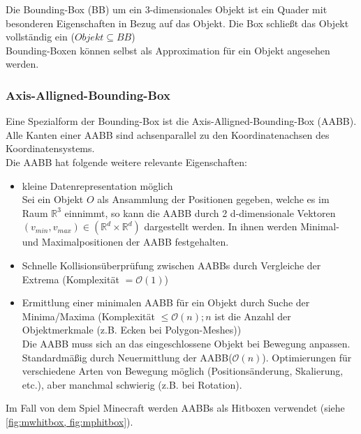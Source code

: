 Die Bounding-Box (BB) um ein 3-dimensionales Objekt ist ein Quader mit besonderen Eigenschaften in Bezug auf das Objekt. Die Box schließt das Objekt vollständig ein ($Objekt \subseteq BB$)\\
Bounding-Boxen können selbst als Approximation für ein Objekt angesehen werden.\\
\subsubsection{Axis-Alligned-Bounding-Box}
Eine Spezialform der Bounding-Box ist die Axis-Alligned-Bounding-Box (AABB). Alle Kanten einer AABB sind achsenparallel zu den Koordinatenachsen des Koordinatensystems.\\
Die AABB hat folgende weitere relevante Eigenschaften:
\begin{itemize}
	\item kleine Datenrepresentation möglich\\
		Sei ein Objekt $O$ als Ansammlung der Positionen gegeben, welche es im Raum $\mathbb{R}^3$ einnimmt, so kann die AABB durch 2 d-dimensionale Vektoren $(v_{min}, v_{max}) \in (\mathbb{R}^{d}\times\mathbb{R}^{d})$ dargestellt werden. In ihnen werden Minimal- und Maximalpositionen der AABB festgehalten.
	\item Schnelle Kollisionsüberprüfung zwischen AABBs durch Vergleiche der Extrema (Komplexität $= \mathcal{O}(1)$)
	\item Ermittlung einer minimalen AABB für ein Objekt durch Suche der Minima/Maxima (Komplexität $\le \mathcal{O}(n); n $ ist die Anzahl der Objektmerkmale (z.B. Ecken bei Polygon-Meshes))\\
		Die AABB muss sich an das eingeschlossene Objekt bei Bewegung anpassen. Standardmäßig durch Neuermittlung der AABB($\mathcal{O}(n)$). Optimierungen für verschiedene Arten von Bewegung möglich (Positionsänderung, Skalierung, etc.), aber manchmal schwierig (z.B. bei Rotation).
\end{itemize}

Im Fall von dem Spiel Minecraft werden AABBs als Hitboxen verwendet (siehe \ref{fig:mwhitbox, fig:mphitbox}).

